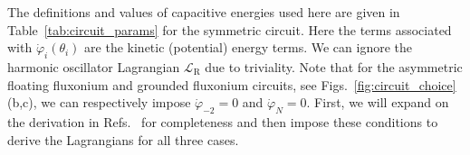 \documentclass[%
reprint,
superscriptaddress,
 amsmath,amssymb,
 aps,
 prx,
longbibliography,
floatfix,
]{revtex4-2}
\begin{document}
The definitions and values of capacitive energies used here are given in Table~\ref{tab:circuit_params} for the symmetric circuit. Here the terms associated with $\dot{\varphi}_i (\theta_i)$ are the kinetic (potential) energy terms. We can ignore the harmonic oscillator Lagrangian $\mathcal{L}_\textrm{R}$ due to triviality. Note that for the asymmetric floating fluxonium and grounded fluxonium circuits, see Figs.~\ref{fig:circuit_choice}(b,c), we can respectively impose $\dot{\varphi}_{-2}=0$ and $\dot{\varphi}_{N}=0$. 
First, we will expand on the derivation in Refs.~\cite{ferguson2013symmetries,viola2015collective} for completeness and then impose these conditions to derive the Lagrangians for all three cases. 
\end{document}
